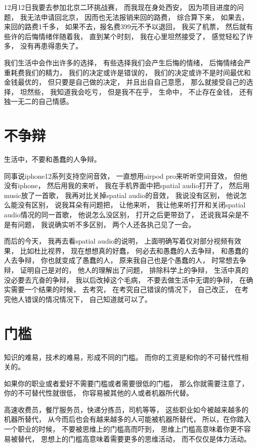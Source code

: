 12月12日我要去参加北京二环挑战赛，
而我现在身处西安，
因为项目进度的问题，
我无法申请回北京，
因而也无法报销来回的路费，
综合算下来，
如果去，来回的路费1千多，
如果不去，报名费399元不予以退回，
我买了机票，
然后就有些许的后悔情绪伴随着我，
直到某个时刻，
我在心里坦然接受了，
感觉轻松了许多，
没有再患得患失了。



我们生活中会作出许多的选择，
有些选择我们会产生后悔的情绪，
后悔情绪会严重耗费我们的精力，
我们的决定或许是错误的，
我们的决定或许不是时间最优和金钱最优的，
但只要是自己做的决定，
并且出自自己意愿，
那么就接受自己的选择，
坦然些，
我知道我会吃亏，
但是我不在乎，
生命中，
不止存在金钱，
还有独一无二的自己情感。







\section{不争辩}


生活中，不要和愚蠢的人争辩。


同事说iphone12系列支持空间音效，
一直想用airpod pro来听听空间音效，
但他没有iphone，
然后用我的来听，
我在手机界面中把spatial audio打开了，
然后用music放了一首歌，
我再对比关掉spatial audio的音效，
我说没有区别，
他说怎么能没有区别，
说我耳朵有问题把，
让他来听，
我让他来听打开和关闭spatial audio情况的同一首歌，
他说怎么没区别，
打开之后更带劲了，
还说我耳朵是不是有问题，
我说确实听不多区别，
两个人还各执己见了一会。

而后的今天，
我再去看spatial audio的说明，
上面明确写着仅对部分视频有效果，
比如杜比视界，
现在想想真的好蠢，
何必去和愚蠢的人去争辩，
和愚蠢的人去争辩，
你也就变成了愚蠢的人，
原来我自己也是个愚蠢的人，
时常想去争辩，
证明自己是对的，
他人的理解出了问题，
排除科学上的争辩，
生活中真的没必要去亢奋的争辩，
我以后改掉这个毛病，
不要去做生活中无谓的争辩，
在确实需要一个结果的时候，
去考究，
在考究自己错误的情况下，
自己改正，
在考究他人错误的情况情况下，
自己知道就可以了。



\section{门槛}


知识的难易，技术的难易，形成不同的门槛。
而你的工资是和你的不可替代性相关的。


如果你的职业或者爱好不需要门槛或者需要很低的门槛，
那么你就需要注意了，
你的不可替代性就很低，
你容易被其他的人或者机器所代替。

高速收费员，餐厅服务员，快递分拣员，司机等等，
这些职业如今被越来越多的机器所替代，
从今而后也会有越来越多的人可能被机器所替代，
所以，在你踏入一个职业的时候，
不要被思维上的门槛高而吓到，
思维上门槛高意味着你更不容易被替代，
思想上的门槛高意味着需要更多的思维活动，
而不仅仅是体力活动。






